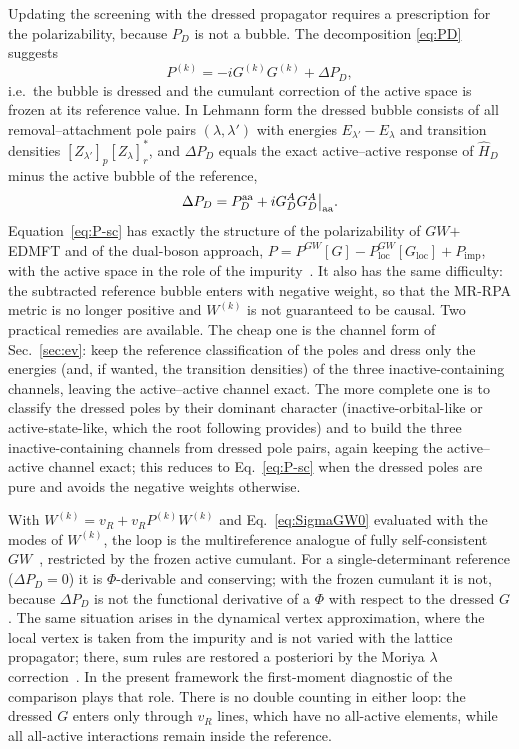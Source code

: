 \documentclass[11pt,a4paper]{article}
\newcommand{\GW}{$GW$}
\newcommand{\imp}{\mathrm{imp}}
\newcommand{\loc}{\mathrm{loc}}
\begin{document}
Updating the screening with the dressed propagator requires a prescription
for the polarizability, because $P_D$ is not a bubble.  The decomposition
\eqref{eq:PD} suggests
\begin{equation}
  P^{(k)}=-iG^{(k)}G^{(k)}+\Delta P_D,
  \label{eq:P-sc}
\end{equation}
i.e.\ the bubble is dressed and the cumulant correction of the active space
is frozen at its reference value.  In Lehmann form the dressed bubble
consists of all removal--attachment pole pairs $(\lambda,\lambda')$ with
energies $E_{\lambda'}-E_\lambda$ and transition densities
$[Z_{\lambda'}]_p[Z_\lambda]_r^{*}$, and $\Delta P_D$ equals the exact
active--active response of $\hat H_D$ minus the active bubble of the
reference,
\begin{equation}
  \Delta P_D=P_D^{\rm aa}+iG_D^AG_D^A\big|_{\rm aa} .
  \label{eq:DeltaPD}
\end{equation}
Equation~\eqref{eq:P-sc} has exactly the structure of the polarizability of
\GW{}$+$EDMFT and of the dual-boson approach,
$P=P^{GW}[G]-P^{GW}_{\loc}[G_{\loc}]+P_{\imp}$, with the active space in the
role of the impurity~\cite{Biermann2003,Ayral2013,RubtsovDB2012}.  It also
has the same difficulty: the subtracted reference bubble enters with
negative weight, so that the MR-RPA metric is no longer positive and
$W^{(k)}$ is not guaranteed to be causal.  Two practical remedies are
available.  The cheap one is the channel form of Sec.~\ref{sec:ev}: keep the
reference classification of the poles and dress only the energies (and, if
wanted, the transition densities) of the three inactive-containing channels,
leaving the active--active channel exact.  The more complete one is to
classify the dressed poles by their dominant character (inactive-orbital-like
or active-state-like, which the root following provides) and to build the
three inactive-containing channels from dressed pole pairs, again keeping
the active--active channel exact; this reduces to Eq.~\eqref{eq:P-sc} when
the dressed poles are pure and avoids the negative weights otherwise.

With $W^{(k)}=v_R+v_RP^{(k)}W^{(k)}$ and Eq.~\eqref{eq:SigmaGW0} evaluated
with the modes of $W^{(k)}$, the loop is the multireference analogue of
fully self-consistent \GW{}~\cite{HolmvonBarth1998,Caruso2012}, restricted
by the frozen active cumulant.  For a single-determinant reference
($\Delta P_D=0$) it is $\Phi$-derivable and conserving; with the frozen
cumulant it is not, because $\Delta P_D$ is not the functional derivative of
a $\Phi$ with respect to the dressed $G$.  The same situation arises in the
dynamical vertex approximation, where the local vertex is taken from the
impurity and is not varied with the lattice propagator; there, sum rules are
restored a posteriori by the Moriya $\lambda$
correction~\cite{Rohringer2018}.  In the present framework the first-moment
diagnostic of the comparison plays that role.  There is no double counting in
either loop: the dressed $G$ enters only through $v_R$ lines, which have no
all-active elements, while all all-active interactions remain inside the
reference.
\end{document}
